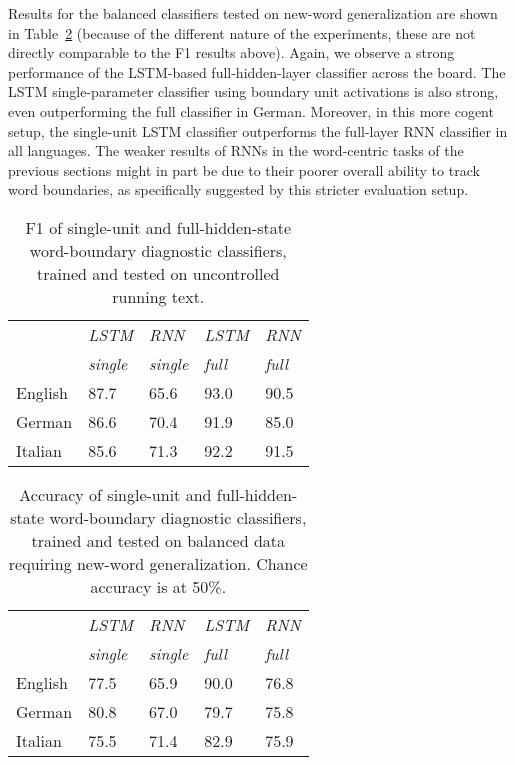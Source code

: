 Results for the balanced classifiers tested on new-word
generalization are shown in Table~\ref{tab:segmentation-results}
(because of the different nature of the experiments, these
are not directly comparable to the F1 results above). Again, we
observe a strong performance of the LSTM-based full-hidden-layer
classifier across the board. The LSTM
single-parameter classifier using boundary unit activations is also strong,  even outperforming the full classifier in German. %
Moreover, in this more cogent setup, the single-unit LSTM classifier
outperforms the full-layer RNN classifier in all languages. The weaker
results of RNNs in the word-centric tasks of the previous sections
might in part be due to their poorer overall ability to track word boundaries,
as specifically suggested by this stricter evaluation setup. %

\begin{table}[t]
	\small
  \begin{center}
    \begin{tabular}{l|l|l|l|l|}
      \multicolumn{1}{c|}{}&\emph{LSTM}&\emph{RNN}&\emph{LSTM}&\emph{RNN}\\
            \multicolumn{1}{c|}{}&\emph{single}&\emph{single}&\emph{full}&\emph{full}\\
      \hline
	    English & 87.7  &  65.6 & 93.0 & 90.5 \\ 
	    German  & 86.6  &  70.4 & 91.9 & 85.0 \\ 
	    Italian & 85.6  &  71.3 & 92.2 & 91.5 \\ 
    \end{tabular}
  \end{center}
  \caption{\label{tab:segmentation-results-real} F1 of single-unit and full-hidden-state word-boundary diagnostic classifiers, trained and tested on uncontrolled running text.}
\end{table}

\begin{table}[t]
	\small
  \begin{center}
    \begin{tabular}{l|l|l|l|l|}
      \multicolumn{1}{c|}{}&\emph{LSTM}&\emph{RNN}&\emph{LSTM}&\emph{RNN}\\
            \multicolumn{1}{c|}{}&\emph{single}&\emph{single}&\emph{full}&\emph{full}\\
      \hline
      English & 77.5 & 65.9 & 90.0 & 76.8\\ 
      German  & 80.8 & 67.0 & 79.7 & 75.8\\ 
      Italian & 75.5 & 71.4 & 82.9 & 75.9\\ 
    \end{tabular}
  \end{center}
  \caption{\label{tab:segmentation-results} Accuracy of  single-unit and full-hidden-state word-boundary diagnostic classifiers, trained and tested on balanced data requiring new-word generalization. Chance accuracy is at 50\%.}
\end{table}

